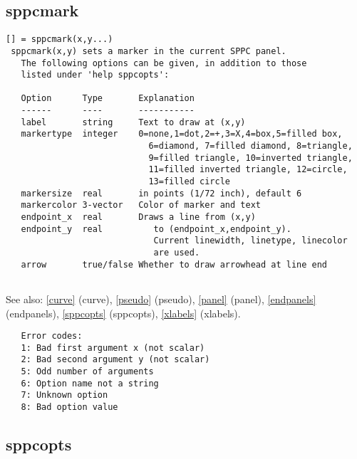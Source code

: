 \documentclass[a4paper]{article}
\begin{document}
\subsection{sppcmark\label{sppcmark}}

\begin{tscreen}
\begin{verbatim}
[] = sppcmark(x,y...)
 sppcmark(x,y) sets a marker in the current SPPC panel.
   The following options can be given, in addition to those
   listed under 'help sppcopts':

   Option      Type       Explanation
   ------      ----       -----------
   label       string     Text to draw at (x,y)
   markertype  integer    0=none,1=dot,2=+,3=X,4=box,5=filled box,
                            6=diamond, 7=filled diamond, 8=triangle,
                            9=filled triangle, 10=inverted triangle,
                            11=filled inverted triangle, 12=circle,
                            13=filled circle
   markersize  real       in points (1/72 inch), default 6
   markercolor 3-vector   Color of marker and text
   endpoint_x  real       Draws a line from (x,y)
   endpoint_y  real          to (endpoint_x,endpoint_y).
                             Current linewidth, linetype, linecolor
                             are used.
   arrow       true/false Whether to draw arrowhead at line end                                                  
   
\end{verbatim}

See also: \ref{curve} {(curve)}, \ref{pseudo} {(pseudo)}, \ref{panel} {(panel)}, \ref{endpanels} {(endpanels)}, \ref{sppcopts} {(sppcopts)}, \ref{xlabels} {(xlabels)}.
\begin{verbatim}
   Error codes:
   1: Bad first argument x (not scalar)
   2: Bad second argument y (not scalar)
   5: Odd number of arguments
   6: Option name not a string
   7: Unknown option
   8: Bad option value
\end{verbatim}
\end{tscreen}



\subsection{sppcopts\label{sppcopts}}
\end{document}

